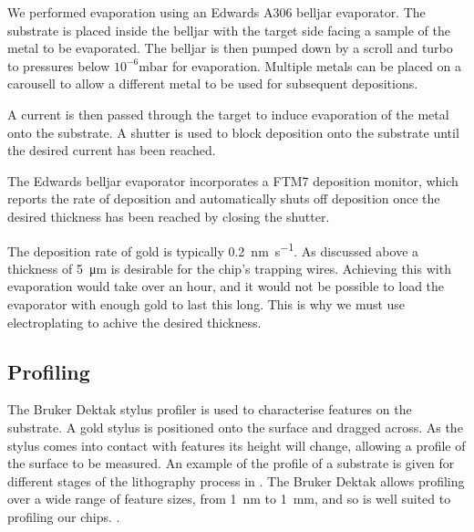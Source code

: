 We performed evaporation using an Edwards A306 belljar evaporator.  The
substrate is placed inside the belljar with the target side facing a sample of
the metal to be evaporated. The belljar is then pumped down by a scroll and
turbo to pressures below $10^{-6}\si{\milli\bar}$ for evaporation. Multiple
metals can be placed on a carousell to allow a different metal to be used for
subsequent depositions.


A current is then passed through the target to induce evaporation of the metal
onto the substrate. A shutter is used to block deposition onto the substrate
until the desired current has been reached.

The Edwards belljar evaporator incorporates a FTM7 deposition monitor, which
reports the rate of deposition and automatically shuts off deposition once the
desired thickness has been reached by closing the shutter. 

The deposition rate of gold is typically \SI{0.2}{\nano\meter\per\second}.
%
%
As discussed above a thickness of \SI{5}{\micro\meter} is desirable for the
chip's trapping wires. Achieving this with evaporation would take over an hour,
and it would not be possible to load the evaporator with enough gold to last
this long. This is why we must use electroplating to achive the desired
thickness.

\subsection{Profiling}
\label{fab:profile}

The Bruker Dektak stylus profiler is used to characterise features on the
substrate. A gold stylus is positioned onto the surface and dragged across. As
the stylus comes into contact with features its height will change, allowing a
profile of the surface to be measured. An example of the profile of a substrate
is given for different stages of the lithography process in
. The Bruker Dektak allows profiling over a wide
range of feature sizes, from \SI{1}{\nano\meter} to \SI{1}{\milli\meter}, and
so is well suited to profiling our chips.
%
.

